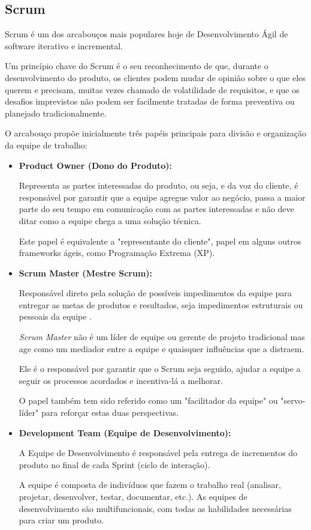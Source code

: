 \subsection{Scrum}
\par Scrum é um dos arcabouços mais populares hoje de Desenvolvimento Ágil de software iterativo e incremental. 
\par Um princípio chave do Scrum é o seu reconhecimento de que, durante o desenvolvimento do produto, os clientes podem mudar de opinião sobre o que eles querem e precisam, muitas vezes chamado de volatilidade de requisitos, e que os desafios imprevistos não podem ser facilmente tratadas de forma preventiva ou planejado tradicionalmente.
\par O arcabouço propõe inicialmente três papéis principais para divisão e organização da equipe de trabalho:
\begin{itemize}
\item\textbf{Product Owner (Dono do Produto):}
\par Representa as partes interessadas do produto, ou seja, e da voz do cliente, é responsável por garantir que a equipe agregue valor ao negócio, passa a maior parte do seu tempo em comunicação com as partes interessadas e não deve ditar como a equipe chega a uma solução técnica. 
\par Este papel é equivalente a "representante do cliente", papel em alguns outros frameworks ágeis, como Programação Extrema (XP).
\item\textbf{Scrum Master (Mestre Scrum):}
\par Responsável direto pela solução de possíveis impedimentos da equipe para entregar as metas de produtos e resultados, seja impedimentos estruturais ou pessoais da equipe . 
\par \emph{Scrum Master} não é um líder de equipe ou gerente de projeto tradicional mas age como um mediador entre a equipe e quaisquer influências que a distraem. 
\par Ele é o responsável por garantir que o Scrum seja seguido, ajudar a equipe a seguir os processos acordados e incentiva-lá a melhorar. 
\par O papel também tem sido referido como um "facilitador da equipe" ou "servo-líder" para reforçar estas duas perspectivas.
\item\textbf{Development Team (Equipe de Desenvolvimento):}
\par A Equipe de Desenvolvimento é responsável pela entrega de incrementos do produto no final de cada Sprint (ciclo de interação). 
\par A equipe é composta de indivíduos que fazem o trabalho real (analisar, projetar, desenvolver, testar, documentar, etc.). As equipes de desenvolvimento são multifuncionais, com todas as habilidades necessárias para criar um produto.
\end{itemize}
